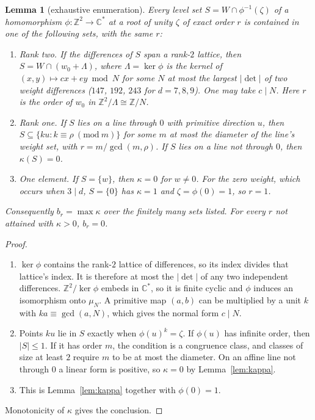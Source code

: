 \documentclass[11pt]{amsart}
\newtheorem{lemma}[theorem]{Lemma}
\theoremstyle{definition}
\theoremstyle{remark}
\newcommand{\C}{\mathbb{C}}
\newcommand{\Z}{\mathbb{Z}}
\begin{document}
\begin{lemma}[exhaustive enumeration]\label{lem:enum}
Every level set $S=W\cap\phi^{-1}(\zeta)$ of a homomorphism $\phi:\Z^2\to\C^*$ at a root of unity $\zeta$ of exact order $r$ is contained in one of the following sets, with the same $r$:
\begin{enumerate}
\item[(i)] \emph{Rank two.} If the differences of $S$ span a rank-$2$ lattice, then $S=W\cap(w_0+\Lambda)$, where $\Lambda=\ker\phi$ is the kernel of $(x,y)\mapsto cx+ey\bmod N$ for some $N$ at most the largest $|\det|$ of two weight differences ($147$, $192$, $243$ for $d=7,8,9$). One may take $c\mid N$. Here $r$ is the order of $w_0$ in $\Z^2/\Lambda\cong\Z/N$.
\item[(ii)] \emph{Rank one.} If $S$ lies on a line through $0$ with primitive direction $u$, then $S\subseteq\{ku:k\equiv\rho\ (\mathrm{mod}\ m)\}$ for some $m$ at most the diameter of the line's weight set, with $r=m/\gcd(m,\rho)$. If $S$ lies on a line not through $0$, then $\kappa(S)=0$.
\item[(iii)] \emph{One element.} If $S=\{w\}$, then $\kappa=0$ for $w\neq0$. For the zero weight, which occurs when $3\mid d$, $S=\{0\}$ has $\kappa=1$ and $\zeta=\phi(0)=1$, so $r=1$.
\end{enumerate}
Consequently $b_r=\max\kappa$ over the finitely many sets listed. For every $r$ not attained with $\kappa>0$, $b_r=0$.
\end{lemma}
\begin{proof}
\begin{enumerate}
\item[(i)] $\ker\phi$ contains the rank-$2$ lattice of differences, so its index divides that lattice's index. It is therefore at most the $|\det|$ of any two independent differences. $\Z^2/\ker\phi$ embeds in $\C^*$, so it is finite cyclic and $\phi$ induces an isomorphism onto $\mu_N$. A primitive map $(a,b)$ can be multiplied by a unit $k$ with $ka\equiv\gcd(a,N)$, which gives the normal form $c\mid N$.
\item[(ii)] Points $ku$ lie in $S$ exactly when $\phi(u)^k=\zeta$. If $\phi(u)$ has infinite order, then $|S|\le1$. If it has order $m$, the condition is a congruence class, and classes of size at least $2$ require $m$ to be at most the diameter. On an affine line not through $0$ a linear form is positive, so $\kappa=0$ by Lemma~\ref{lem:kappa}.
\item[(iii)] This is Lemma~\ref{lem:kappa} together with $\phi(0)=1$.
\end{enumerate}
Monotonicity of $\kappa$ gives the conclusion.
\end{proof}
\end{document}
